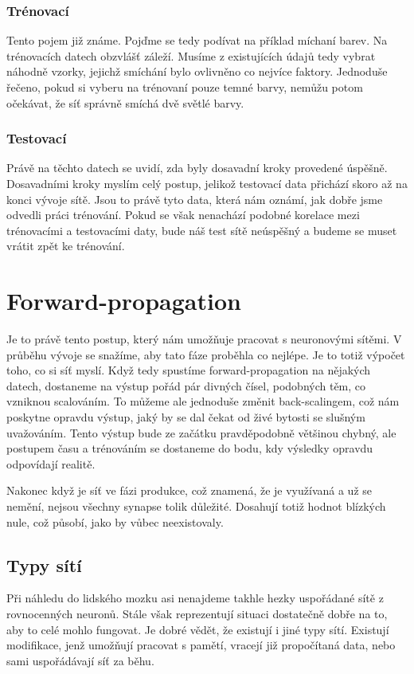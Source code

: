 \documentclass[12pt,a4paper]{report}
\begin{document}
		\subsection{Trénovací}
		Tento pojem již známe. Pojďme se tedy podívat na příklad míchaní barev. Na trénovacích datech obzvlášť záleží. Musíme z existujících údajů tedy vybrat náhodně vzorky, jejichž smíchání bylo ovlivněno co nejvíce faktory. Jednoduše řečeno, pokud si vyberu na trénovaní pouze temné barvy, nemůžu potom očekávat, že síť správně smíchá dvě světlé barvy.
		\subsection{Testovací}
		Právě na těchto datech se uvidí, zda byly dosavadní kroky provedené úspěšně. Dosavadními kroky myslím celý postup, jelikož testovací data přichází skoro až na konci vývoje sítě. Jsou to právě tyto data, která nám oznámí, jak dobře jsme odvedli práci trénování. Pokud se však nenachází podobné korelace mezi trénovacími a testovacími daty, bude náš test sítě neúspěšný a budeme se muset vrátit zpět ke trénování.
\chapter{Forward-propagation}
	Je to právě tento postup, který nám umožňuje pracovat s neuronovými sítěmi. V průběhu vývoje se snažíme, aby tato fáze proběhla co nejlépe. Je to totiž výpočet toho, co si síť myslí. Když tedy spustíme forward-propagation na nějakých datech, dostaneme na výstup pořád pár divných čísel, podobných těm, co vzniknou scalováním. To můžeme ale jednoduše změnit back-scalingem, což nám poskytne opravdu výstup, jaký by se dal čekat od živé bytosti se slušným uvažováním. Tento výstup bude ze začátku pravděpodobně většinou chybný, ale postupem času a trénováním se dostaneme do bodu, kdy výsledky opravdu odpovídají realitě.
	
	Nakonec když je síť ve fázi produkce, což znamená, že je využívaná a už se nemění, nejsou všechny synapse tolik důležité. Dosahují totiž hodnot blízkých nule, což působí, jako by vůbec neexistovaly.
	\section{Typy sítí}
	Při náhledu do lidského mozku asi nenajdeme takhle hezky uspořádané sítě z rovnocenných neuronů. Stále však reprezentují situaci dostatečně dobře na to, aby to celé mohlo fungovat. Je dobré vědět, že existují i jiné typy sítí. Existují modifikace, jenž umožňují pracovat s pamětí, vracejí již propočítaná data, nebo sami uspořádávají síť za běhu.
\end{document}
